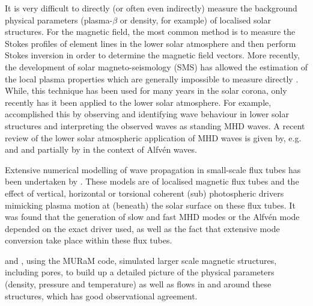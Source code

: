     It is very difficult to directly (or often even indirectly) measure the background physical parameters (plasma-$\beta$ or density, for example) of localised solar structures.
    For the magnetic field, the  most common method is to measure the Stokes profiles of element lines in the lower solar atmosphere and then perform Stokes inversion in order to determine the magnetic field vectors.
    More recently, the development of solar magneto-seismology (SMS) has allowed the estimation of the local plasma properties which are generally impossible to measure directly \citep{Andries2009,Ruderman2009}.
    While, this technique has been used for many years in the solar corona, only recently has it been applied to the lower solar atmosphere.
    For example, \citet{PMHDW} accomplished this by observing and identifying wave behaviour in lower solar structures and interpreting the observed waves as standing MHD waves.
    A recent review of the lower solar atmospheric application of MHD waves is given by, e.g. \citet{Banerjee2007} and \citet{jess2015multiwavelength} and partially by \citet{Mathioudakis2013} in the context of Alfv{\'e}n waves.
    
    Extensive numerical modelling of wave propagation in small-scale flux tubes has been undertaken by \citet{khomenko,hasan2008dynamics,fedun2,fedun1,2011ApJ...730L..24K,2011AnGeo..29..883S,Vigeesh2012,Wedemeyer2012,Mumford2015}.
    These models are of localised magnetic flux tubes and the effect of vertical, horizontal or torsional coherent (sub) photospheric drivers mimicking plasma motion at (beneath) the solar surface on these flux tubes.
    It was found that the generation of slow and fast MHD modes or the Alfv{\'e}n mode depended on the exact driver used, as well as the fact that extensive mode conversion take place within these flux tubes.
    
    \citet{vogler} and \citet{cameron}, using the MURaM code, simulated larger scale magnetic structures, including pores, to build up a detailed picture of the physical parameters (density, pressure and temperature) as well as flows in and around these structures, which has good observational agreement.
    
